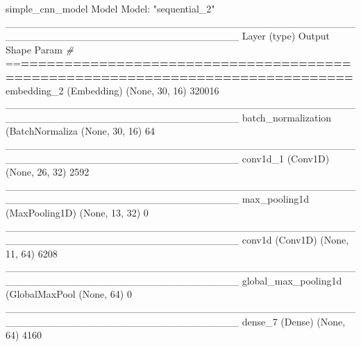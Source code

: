 \documentclass[
]{article}
\newenvironment{Shaded}{}{}
\newcommand{\CommentTok}[1]{\textcolor[rgb]{0.38,0.63,0.69}{\textit{#1}}}
\newcommand{\DecValTok}[1]{\textcolor[rgb]{0.25,0.63,0.44}{#1}}
\newcommand{\ErrorTok}[1]{\textcolor[rgb]{1.00,0.00,0.00}{\textbf{#1}}}
\newcommand{\FunctionTok}[1]{\textcolor[rgb]{0.02,0.16,0.49}{#1}}
\newcommand{\NormalTok}[1]{#1}
\newcommand{\SpecialCharTok}[1]{\textcolor[rgb]{0.25,0.44,0.63}{#1}}
\newcommand{\StringTok}[1]{\textcolor[rgb]{0.25,0.44,0.63}{#1}}
\begin{document}
\begin{Shaded}
\begin{Highlighting}[]
\NormalTok{simple\_cnn\_model}
\NormalTok{Model}
\NormalTok{Model}\SpecialCharTok{:} \StringTok{"sequential\_2"}
\NormalTok{\_\_\_\_\_\_\_\_\_\_\_\_\_\_\_\_\_\_\_\_\_\_\_\_\_\_\_\_\_\_\_\_\_\_\_\_\_\_\_\_\_\_\_\_\_\_\_\_\_\_\_\_\_\_\_\_\_\_\_\_\_\_\_\_\_\_\_\_\_\_\_\_\_\_\_\_\_\_\_\_}
\FunctionTok{Layer}\NormalTok{ (type)                        Output Shape                    Param }\CommentTok{\#     }
\SpecialCharTok{==}\ErrorTok{==============================================================================}
\FunctionTok{embedding\_2}\NormalTok{ (Embedding)             (None, }\DecValTok{30}\NormalTok{, }\DecValTok{16}\NormalTok{)                  }\DecValTok{320016}      
\NormalTok{\_\_\_\_\_\_\_\_\_\_\_\_\_\_\_\_\_\_\_\_\_\_\_\_\_\_\_\_\_\_\_\_\_\_\_\_\_\_\_\_\_\_\_\_\_\_\_\_\_\_\_\_\_\_\_\_\_\_\_\_\_\_\_\_\_\_\_\_\_\_\_\_\_\_\_\_\_\_\_\_}
\FunctionTok{batch\_normalization}\NormalTok{ (}\FunctionTok{BatchNormaliza}\NormalTok{ (None, }\DecValTok{30}\NormalTok{, }\DecValTok{16}\NormalTok{)                  }\DecValTok{64}          
\NormalTok{\_\_\_\_\_\_\_\_\_\_\_\_\_\_\_\_\_\_\_\_\_\_\_\_\_\_\_\_\_\_\_\_\_\_\_\_\_\_\_\_\_\_\_\_\_\_\_\_\_\_\_\_\_\_\_\_\_\_\_\_\_\_\_\_\_\_\_\_\_\_\_\_\_\_\_\_\_\_\_\_}
\FunctionTok{conv1d\_1}\NormalTok{ (Conv1D)                   (None, }\DecValTok{26}\NormalTok{, }\DecValTok{32}\NormalTok{)                  }\DecValTok{2592}        
\NormalTok{\_\_\_\_\_\_\_\_\_\_\_\_\_\_\_\_\_\_\_\_\_\_\_\_\_\_\_\_\_\_\_\_\_\_\_\_\_\_\_\_\_\_\_\_\_\_\_\_\_\_\_\_\_\_\_\_\_\_\_\_\_\_\_\_\_\_\_\_\_\_\_\_\_\_\_\_\_\_\_\_}
\FunctionTok{max\_pooling1d}\NormalTok{ (MaxPooling1D)        (None, }\DecValTok{13}\NormalTok{, }\DecValTok{32}\NormalTok{)                  }\DecValTok{0}           
\NormalTok{\_\_\_\_\_\_\_\_\_\_\_\_\_\_\_\_\_\_\_\_\_\_\_\_\_\_\_\_\_\_\_\_\_\_\_\_\_\_\_\_\_\_\_\_\_\_\_\_\_\_\_\_\_\_\_\_\_\_\_\_\_\_\_\_\_\_\_\_\_\_\_\_\_\_\_\_\_\_\_\_}
\FunctionTok{conv1d}\NormalTok{ (Conv1D)                     (None, }\DecValTok{11}\NormalTok{, }\DecValTok{64}\NormalTok{)                  }\DecValTok{6208}        
\NormalTok{\_\_\_\_\_\_\_\_\_\_\_\_\_\_\_\_\_\_\_\_\_\_\_\_\_\_\_\_\_\_\_\_\_\_\_\_\_\_\_\_\_\_\_\_\_\_\_\_\_\_\_\_\_\_\_\_\_\_\_\_\_\_\_\_\_\_\_\_\_\_\_\_\_\_\_\_\_\_\_\_}
\FunctionTok{global\_max\_pooling1d}\NormalTok{ (}\FunctionTok{GlobalMaxPool}\NormalTok{ (None, }\DecValTok{64}\NormalTok{)                      }\DecValTok{0}           
\NormalTok{\_\_\_\_\_\_\_\_\_\_\_\_\_\_\_\_\_\_\_\_\_\_\_\_\_\_\_\_\_\_\_\_\_\_\_\_\_\_\_\_\_\_\_\_\_\_\_\_\_\_\_\_\_\_\_\_\_\_\_\_\_\_\_\_\_\_\_\_\_\_\_\_\_\_\_\_\_\_\_\_}
\FunctionTok{dense\_7}\NormalTok{ (Dense)                     (None, }\DecValTok{64}\NormalTok{)                      }\DecValTok{4160}        

\end{Highlighting}
\end{Shaded}
\end{document}
